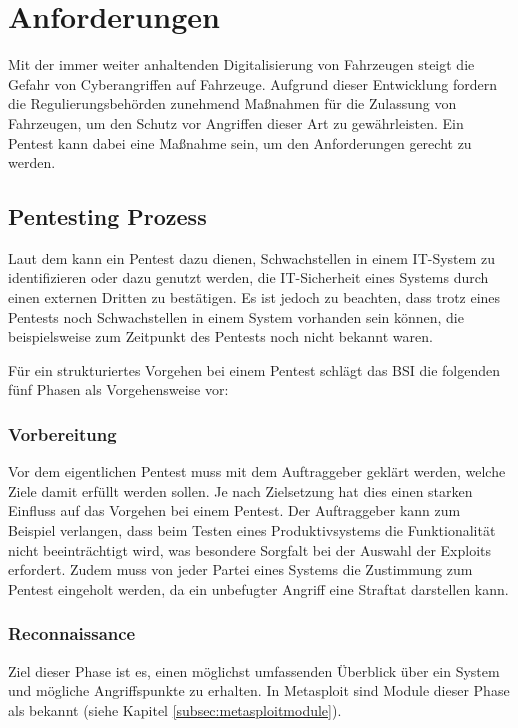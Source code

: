 \chapter{Anforderungen}\label{sec:anforderungen}
Mit der immer weiter anhaltenden Digitalisierung von Fahrzeugen steigt die Gefahr von Cyberangriffen auf Fahrzeuge. Aufgrund dieser Entwicklung fordern die Regulierungsbehörden zunehmend Maßnahmen für die Zulassung von Fahrzeugen, um den Schutz vor Angriffen dieser Art zu gewährleisten. Ein Pentest kann dabei eine Maßnahme sein, um den Anforderungen gerecht zu werden. 

\section{Pentesting Prozess}\label{sec:generalpentesting}

Laut dem \cite{pentest} kann ein Pentest dazu dienen, Schwachstellen in einem IT-System zu identifizieren oder dazu genutzt werden, die IT-Sicherheit eines Systems durch einen externen Dritten zu bestätigen. Es ist jedoch zu beachten, dass trotz eines Pentests noch Schwachstellen in einem System vorhanden sein können, die beispielsweise zum Zeitpunkt des Pentests noch nicht bekannt waren. 

Für ein strukturiertes Vorgehen bei einem Pentest schlägt das BSI die folgenden fünf Phasen als Vorgehensweise vor:

\subsection{Vorbereitung}\label{subsec:pentestvor}
Vor dem eigentlichen Pentest muss mit dem Auftraggeber geklärt werden, welche Ziele damit erfüllt werden sollen. Je nach Zielsetzung hat dies einen starken Einfluss auf das Vorgehen bei einem Pentest. Der Auftraggeber kann zum Beispiel verlangen, dass beim Testen eines Produktivsystems die Funktionalität nicht beeinträchtigt wird, was besondere Sorgfalt bei der Auswahl der Exploits erfordert. 
Zudem muss von jeder Partei eines Systems die Zustimmung zum Pentest eingeholt werden, da ein unbefugter Angriff eine Straftat darstellen kann.

\subsection{Reconnaissance}\label{subsec:informationsbeschafung}

Ziel dieser Phase ist es, einen möglichst umfassenden Überblick über ein System und mögliche Angriffspunkte zu erhalten. In Metasploit sind Module dieser Phase als  bekannt (siehe Kapitel \ref{subsec:metasploitmodule}).

